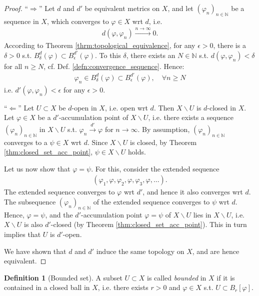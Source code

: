 \documentclass[12pt, a4paper]{article}
\numberwithin{equation}{section}
\theoremstyle{definition}
\theoremstyle{definition}
\newtheorem{defn}[thm]{Definition} %
\begin{document}
	\begin{proof}
		\enquote{$\Longrightarrow$} Let $d$ and $d'$ be equivalent metrics on $X$, and let $(\varphi_n)_{n\in\mathbb N}$ be a sequence in $X$, which converges to $\varphi\in X$ wrt $d$, i.e.
		\begin{align}
			d(\varphi, \varphi_n) \overset{n\to\infty}{\longrightarrow} 0.
		\end{align}
		According to Theorem \ref{thrm:topological_equivalence}, for any $\epsilon > 0$, there is a $\delta > 0$ s.t. $B_{\delta}^{d}(\varphi) \subset B_{\epsilon}^{d'}(\varphi)$. To this $\delta$, there exists an $N\in\mathbb N$ s.t. $d(\varphi, \varphi_n) < \delta$ for all $n\geq N$, cf. Def. \ref{defn:convergence_sequence}. Hence:
		\begin{align}
			\varphi_n\in B^{d}_{\delta}(\varphi) \subset B^{d'}_{\epsilon}(\varphi), \quad \forall n\geq N
		\end{align}
		i.e. $d'(\varphi, \varphi_n) < \epsilon$ for any $\epsilon > 0$.
		
		\enquote{$\Longleftarrow$} Let $U\subset X$ be $d$-open in $X$, i.e. open wrt $d$. Then $X\backslash U$ is $d$-closed in $X$. Let $\varphi\in X$ be a $d'$-accumulation point of $X\backslash U$, i.e. there exists a sequence $(\varphi_n)_{n\in\mathbb N}$ in $X\backslash U$ s.t. $\varphi_n \overset{d'}{\longrightarrow} \varphi$ for $n\to\infty$. By assumption, $(\varphi_n)_{n\in\mathbb N}$ converges to a $\psi\in X$ wrt $d$. Since $X\backslash U$ is closed, by Theorem \ref{thm:closed_set_acc_point}, $\psi\in X\backslash U$ holds. 
		
		Let us now show that $\varphi = \psi$. For this, consider the extended sequence 
		\begin{align}
			\left(\varphi_1, \varphi, \varphi_2, \varphi, \varphi_3, \varphi, \dots\right).
		\end{align}
		The extended sequence converges to $\varphi$ wrt $d'$, and hence it also converges wrt $d$. The subsequence $(\varphi_n)_{n\in\mathbb N}$ of the extended sequence converges to $\psi$ wrt $d$. Hence, $\varphi = \psi$, and the $d'$-accumulation point $\varphi=\psi$ of $X\backslash U$ lies in $X\backslash U$, i.e. $X\backslash U$ is also $d'$-closed (by Theorem \ref{thm:closed_set_acc_point}). This in turn implies that $U$ is $d'$-open.
		
		We have shown that $d$ and $d'$ induce the same topology on $X$, and are hence equivalent.
	\end{proof}

	\begin{defn}[Bounded set]\label{defn:bounded_set}
		A subset $U\subset X$ is called \textit{bounded} in $X$ if it is contained in a closed ball in $X$, i.e. there exists $r > 0$ and $\varphi \in X$ s.t. $U\subset B_{r}[\varphi]$.
	\end{defn}
\end{document}
